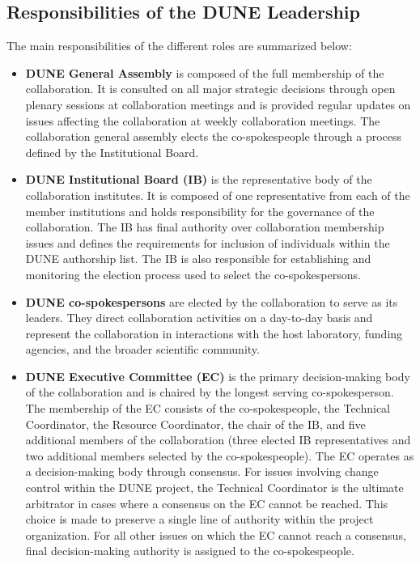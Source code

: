 \subsection{Responsibilities of the DUNE Leadership}

The main responsibilities of the different roles are summarized below:
\begin{itemize}
  \item \textbf{DUNE General Assembly} is composed of the full membership of the collaboration.  It is consulted on all major strategic decisions through open plenary sessions at collaboration meetings and is provided regular updates on issues affecting the collaboration at weekly collaboration meetings.  The collaboration general assembly elects the co-spokespeople through a process defined by the Institutional Board. 
  \item \textbf{DUNE Institutional Board (IB)} is the representative body of the collaboration institutes. It is composed of one representative from each of the member institutions and holds responsibility for the governance of the collaboration.  The IB has final authority over collaboration membership issues and defines the requirements for inclusion of individuals within the DUNE authorship list. The IB is also responsible    
for establishing and monitoring the election process used to select the co-spokespersons.  
  \item \textbf{DUNE co-spokespersons} are elected by the collaboration to serve as its leaders.  They direct collaboration activities on a day-to-day basis and represent the collaboration in interactions with the host laboratory, funding agencies, and the broader scientific community.
  \item \textbf{DUNE Executive Committee (EC)} is the primary decision-making body of the collaboration and is chaired by the longest serving co-spokesperson.  The membership of the EC consists of the co-spokespeople, the Technical Coordinator, the Resource Coordinator, the chair of the IB, and five additional members of the collaboration (three elected IB representatives and two additional members selected by the co-spokespeople).  The EC operates as a decision-making body through consensus.  For issues involving change control within the DUNE project, the Technical Coordinator is the ultimate arbitrator in cases where a consensus on the EC cannot be reached.  This choice is made to preserve a single line of authority within the project organization.  For all other issues on which the EC cannot reach a consensus, final decision-making authority is assigned to the co-spokespeople.   

\end{itemize}
